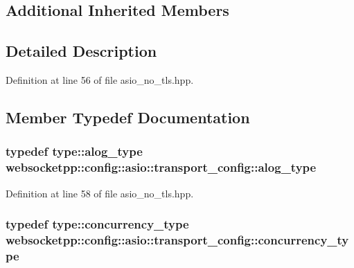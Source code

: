 \subsection*{Additional Inherited Members}


\subsection{Detailed Description}


Definition at line 56 of file asio\+\_\+no\+\_\+tls.\+hpp.



\subsection{Member Typedef Documentation}
\hypertarget{structwebsocketpp_1_1config_1_1asio_1_1transport__config_a524e5797844731f20c0513d6b4857b34}{}
\subsubsection[{alog\+\_\+type}]{\setlength{\rightskip}{0pt plus 5cm}typedef {\bf type\+::alog\+\_\+type} {\bf websocketpp\+::config\+::asio\+::transport\+\_\+config\+::alog\+\_\+type}}\label{structwebsocketpp_1_1config_1_1asio_1_1transport__config_a524e5797844731f20c0513d6b4857b34}


Definition at line 58 of file asio\+\_\+no\+\_\+tls.\+hpp.

\hypertarget{structwebsocketpp_1_1config_1_1asio_1_1transport__config_a512d44142c4cf52cc732eb13e9901405}{}
\subsubsection[{concurrency\+\_\+type}]{\setlength{\rightskip}{0pt plus 5cm}typedef {\bf type\+::concurrency\+\_\+type} {\bf websocketpp\+::config\+::asio\+::transport\+\_\+config\+::concurrency\+\_\+type}}\label{structwebsocketpp_1_1config_1_1asio_1_1transport__config_a512d44142c4cf52cc732eb13e9901405}


